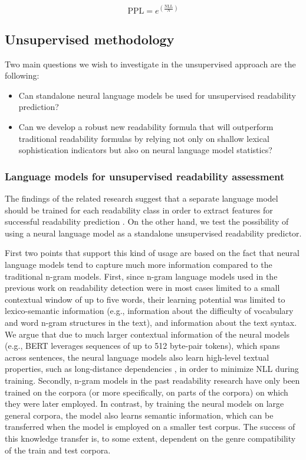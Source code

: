 \documentclass{clv3}
\begin{document}
\[\textrm{PPL} = e^{(\frac{\textrm{NLL}}{N})}\]


\subsection{Unsupervised methodology}
\label{sec-methodology-unsupervised}



Two main questions we wish to investigate in the unsupervised approach are the following:
\begin{itemize}
    \item Can standalone neural language models be used for unsupervised readability prediction?
    \item Can we develop a robust new readability formula that will outperform traditional readability formulas by relying not only on shallow lexical sophistication indicators but also on neural language model statistics?  
\end{itemize}

\subsubsection{Language models for unsupervised readability assessment}
\label{sec:lm_for_readability_assessment}

The findings of the related research suggest that a separate language model should be trained for each readability class in order to extract features for successful readability prediction \citep{petersen2009machine, xia2016text}. On the other hand, we test the possibility of using a neural language model as a standalone unsupervised readability predictor. 

First two points that support this kind of usage are based on the fact that neural language models tend to capture much more information compared to the traditional n-gram models. First, since n-gram language models used in the previous work on readability detection were in most cases limited to a small contextual window of up to five words, their learning potential was limited to lexico-semantic information (e.g., information about the difficulty of vocabulary and word n-gram structures in the text), and information about the text syntax. We argue that due to much larger contextual information of the neural models (e.g., BERT leverages sequences of up to 512 byte-pair tokens), which spans across sentences, the neural language models also learn high-level textual properties, such as long-distance dependencies \citep{jawahar-etal-2019-bert}, in order to minimize NLL during training. Secondly, n-gram models in the past readability research have only been trained on the corpora (or more specifically, on parts of the corpora) on which they were later employed. In contrast, by training the neural models on large general corpora, the model also learns semantic information, which can be transferred when the model is employed on a smaller test corpus. The success of this knowledge transfer is, to some extent, dependent on the genre compatibility of the train and test corpora. 
\end{document}
